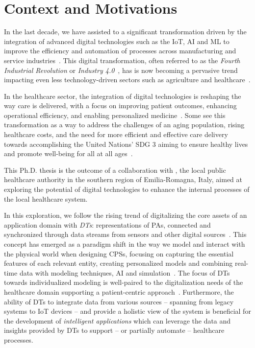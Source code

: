 \glsresetall

\section*{Context and Motivations}

In the last decade, we have assisted to a significant transformation driven by the integration of advanced digital technologies such as the \ac{IoT}, \ac{AI} and \ac{ML} to improve the efficiency and automation of processes across manufacturing and service industries~\missingref{}.
This digital transformation, often referred to as the \emph{Fourth Industrial Revolution} or \emph{Industry 4.0}~\missingref{}, has 
is now becoming a pervasive trend impacting even less technology-driven sectors such as agriculture and healthcare~\missingref{}.

In the healthcare sector, the integration of digital technologies is reshaping the way care is delivered, with a focus on improving patient outcomes, enhancing operational efficiency, and enabling personalized medicine~\missingref{}.
%
Some see this transformation as a way to address the challenges of an aging population, rising healthcare costs, and the need for more efficient and effective care delivery towards accomplishing the United Nations' \ac{SDG} 3 aiming to ensure healthy lives and promote well-being for all at all ages~\cite{un_sdg_report_2025}.

This Ph.D. thesis is the outcome of a collaboration with \auslLong{}, the local public healthcare authority in the southern region of Emilia-Romagna, Italy, aimed at exploring the potential of digital technologies to enhance the internal processes of the local healthcare system. 

In this exploration, we follow the rising trend of digitalizing the core assets of an application domain with \emph{\acp{DT}}: representations of \acp{PA}, connected and synchronized through data streams from sensors and other digital sources~\cite{Grieves_2023}.
%
This concept has emerged as a paradigm shift in the way we model and interact with the physical world when designing \acp{CPS}, focusing on capturing the essential features of each relevant entity, creating personalized models and combining real-time data with modeling techniques, \ac{AI} and simulation~\cite{Semeraro_Lezoche_Panetto_Dassisti_2021}.
%
The focus of \acp{DT} towards individualized modeling is well-paired to the digitalization needs of the healthcare domain supporting a patient-centric approach~\missingref{}.
%
Furthermore, the ability of \acp{DT} to integrate data from various sources
-- spanning from legacy systems to \ac{IoT} devices --
and provide a holistic view of the system is beneficial for the development of \emph{intelligent applications} which can leverage the data and insights provided by \acp{DT} to support -- or partially automate -- healthcare processes.

